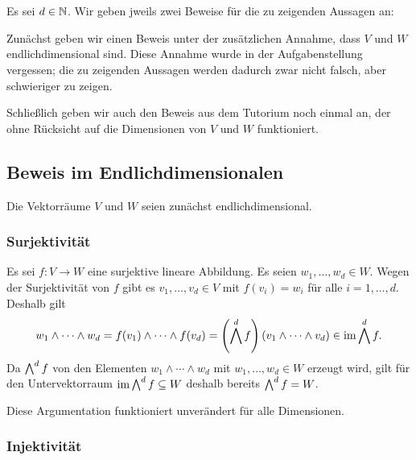 \section{}
Es sei $d \in \mathbb{N}$.
Wir geben jweils zwei Beweise für die zu zeigenden Aussagen an:

Zunächst geben wir einen Beweis unter der zusätzlichen Annahme, dass $V$ und $W$ endlichdimensional sind.
Diese Annahme wurde in der Aufgabenstellung vergessen;
die zu zeigenden Aussagen werden dadurch zwar nicht falsch, aber schwieriger zu zeigen.

Schließlich geben wir auch den Beweis aus dem Tutorium noch einmal an, der ohne Rücksicht auf die Dimensionen von $V$ und $W$ funktioniert.





\subsection{Beweis im Endlichdimensionalen}

Die Vektorräume $V$ und $W$ seien zunächst endlichdimensional.



\subsubsection{Surjektivität}

Es sei $f \colon V \to W$ eine surjektive lineare Abbildung.
Es seien $w_1, \dotsc, w_d \in W$.
Wegen der Surjektivität von $f$ gibt es $v_1, \dotsc, v_d \in V$ mit $f(v_i) = w_i$ für alle $i = 1, \dotsc, d$.
Deshalb gilt
\[
      w_1 \wedge \dotsb \wedge w_d
  =   f(v_1) \wedge \dotsb \wedge f(v_d)
  =   \left( \bigwedge^{d} f \right)(v_1 \wedge \dotsb \wedge v_d)
  \in \operatorname{im} \bigwedge^{d} f.
\]
Da $\bigwedge^{d} f$ von den Elementen $w_1 \wedge \dotsb \wedge w_d$ mit $w_1, \dotsc, w_d \in W$ erzeugt wird, gilt für den Untervektorraum $\operatorname{im} \bigwedge^{d} f \subseteq W$ deshalb bereits $\bigwedge^{d} f = W$.

\begin{remark}
  Diese Argumentation funktioniert unverändert für alle Dimensionen.
\end{remark}



\subsubsection{Injektivität}

